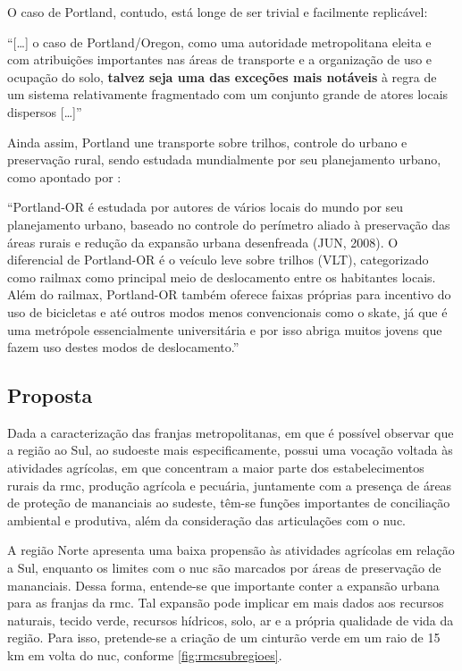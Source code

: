 	O caso de Portland, contudo, está longe de ser trivial e facilmente replicável:
	
	\begin{citacao}
		``[\dots] o caso de Portland/Oregon, como uma autoridade metropolitana eleita e com atribuições importantes nas áreas de transporte e a organização de uso e ocupação do solo, \textbf{talvez seja uma das exceções mais notáveis} à regra de um sistema relativamente fragmentado com um conjunto grande de atores locais dispersos [\dots]'' \cite[p. 224]{klink2009a}
	\end{citacao}

	Ainda assim, Portland une transporte sobre trilhos, controle do urbano e preservação rural, sendo estudada mundialmente por seu planejamento urbano, como apontado por :
	
	\begin{citacao}
		``Portland-OR é estudada por autores de vários locais do mundo por seu planejamento urbano, baseado no controle do perímetro aliado à preservação das áreas rurais e redução da expansão urbana desenfreada (JUN, 2008). O diferencial de Portland-OR é o veículo leve sobre trilhos (VLT), categorizado como railmax como principal meio de deslocamento entre os habitantes locais. Além do railmax, Portland-OR também oferece faixas próprias para incentivo do uso de bicicletas e até outros modos menos convencionais como o skate, já que é uma metrópole essencialmente universitária e por isso abriga muitos jovens que fazem uso destes modos de deslocamento.'' \cite[p. 17]{noronha2015a}
	\end{citacao}

	\subsection{Proposta}
	
	Dada a caracterização das franjas metropolitanas, em que é possível observar que a região ao Sul, ao sudoeste mais especificamente, possui uma vocação voltada às atividades agrícolas, em que concentram a maior parte dos estabelecimentos rurais da \gls{rmc}, produção agrícola e pecuária, juntamente com a presença de áreas de proteção de mananciais ao sudeste, têm-se funções importantes de conciliação ambiental e produtiva, além da consideração das articulações com o \gls{nuc}.
	
	A região Norte apresenta uma baixa propensão às atividades agrícolas em relação a Sul, enquanto os limites com o \gls{nuc} são marcados por áreas de preservação de mananciais. Dessa forma, entende-se que importante conter a expansão urbana para as franjas da \gls{rmc}. Tal expansão pode implicar em mais dados aos recursos naturais, tecido verde, recursos hídricos, solo, ar e a própria qualidade de vida da região. Para isso, pretende-se a criação de um cinturão verde em um raio de 15 km em volta do \glsdesc{nuc}, conforme \autoref{fig:rmcsubregioes}.

